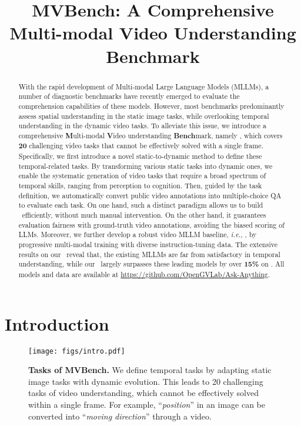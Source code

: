\title{MVBench: A Comprehensive Multi-modal Video Understanding Benchmark}



\maketitle
\begin{abstract}

With the rapid development of Multi-modal Large Language Models (MLLMs), 
a number of diagnostic benchmarks have recently emerged to evaluate the comprehension capabilities of these models.
However,
most benchmarks predominantly assess spatial understanding in the static image tasks,
while 
overlooking temporal understanding in the dynamic video tasks.
To alleviate this issue,
we introduce a comprehensive \textbf{M}ulti-modal \textbf{V}ideo understanding \textbf{Bench}mark,
namely \textbf{\BenchName},
which covers \textbf{20} challenging video tasks that cannot be effectively solved with a single frame.
Specifically,
we first introduce a novel static-to-dynamic method to define these temporal-related tasks.
By transforming various static tasks into dynamic ones, 
we enable the systematic generation of video tasks that require a broad spectrum of temporal skills, ranging from perception to cognition.
Then,
guided by the task definition,
we automatically convert public video annotations into multiple-choice QA to evaluate each task.
On one hand,
such a distinct paradigm allows us to build \BenchName\ efficiently,
without much manual intervention.
On the other hand,
it guarantees evaluation fairness with ground-truth video annotations,
avoiding the biased scoring of LLMs.
Moreover,
we further develop a robust video MLLM baseline,
\textit{i.e.}, 
\textbf{\ModelName},
by progressive multi-modal training with diverse instruction-tuning data.
The extensive results on our \BenchName\ reveal that,
the existing MLLMs are far from satisfactory in temporal understanding,
while our \ModelName\ largely surpasses these leading models by over \textbf{15\%} on \BenchName.
All models and data are available at \url{https://github.com/OpenGVLab/Ask-Anything}.

\end{abstract}\vspace{-0.3cm} 
\section{Introduction}
\label{sec:intro}

\begin{figure}[t]
    \centering
    \texttt{[image: figs/intro.pdf]}
    \vspace{-0.7cm}
    \caption{
    \textbf{Tasks of MVBench.}
    We define temporal tasks by adapting static image tasks with dynamic evolution.
    This leads to 20 challenging tasks of video understanding, 
    which cannot be effectively solved within a single frame.
    For example, 
    ``\textit{position}'' in an image can be converted into ``\textit{moving direction}'' through a video.
    }
    \label{fig:intro}
    \vspace{-0.5cm}
\end{figure}


